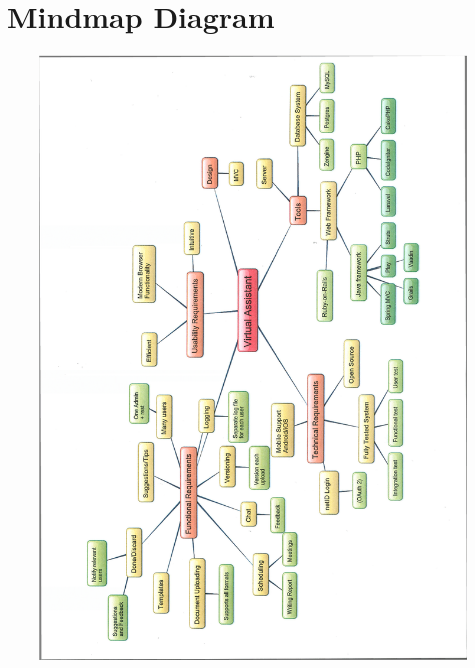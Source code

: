 \chapter{Mindmap Diagram}
\label{mindmap}

\begin{center}
\centering
\includegraphics[width=130mm , height = 160mm]{./img/mindmap.png}	
\end{center}

